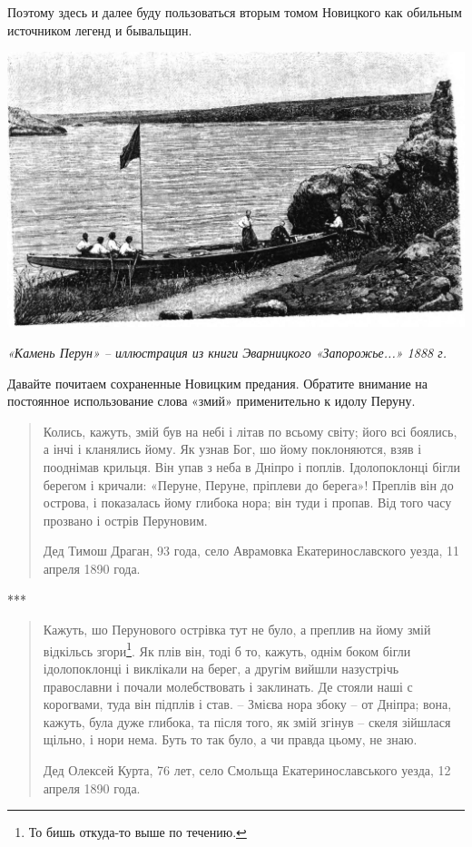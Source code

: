 Поэтому здесь и далее буду пользоваться вторым томом Новицкого как обильным источником легенд и бывальщин. 

\begin{center}
\includegraphics[width=\linewidth]{chast-zmiy/ktotakiezmei/Evarnickij_D_I_Zaporozhje.jpg}

\textit{«Камень Перун» – иллюстрация из книги Эварницкого «Запорожье...» 1888 г.}
\end{center}

Давайте почитаем сохраненные Новицким предания. Обратите внимание на постоянное использование слова «змий» применительно к идолу Перуну.

\begin{quotation}
Колись, кажуть, змій був на небі і літав по всьому світу; його всі боялись, а інчі і кланялись йому. Як узнав Бог, шо йому поклоняются, взяв і пооднімав крильця. Він упав з неба в Дніпро і поплів. Ідолопоклонці бігли берегом і кричали: «Перуне, Перуне, пріплеви до берега»! Преплів він до острова, і показалась йому глибока нора; він туди і пропав. Від того часу прозвано і острів Перуновим.

Дед Тимош Драган, 93 года, село Аврамовка Екатеринославского уезда, 11 апреля 1890 года.
\end{quotation}

\begin{center}
***\end{center}

\begin{quotation}
Кажуть, шо Перунового острівка тут не було, а преплив на йому змій відкільсь згори\footnote{То бишь откуда-то выше по течению.}. Як плів він, тоді б то, кажуть, однім боком бігли ідолопоклонці і виклікали на берег, а другім вийшли назустрічь православни і почали молебствовать і заклинать. Де стояли наші с корогвами, туда він підплів і став. – Змієва нора збоку – от Дніпра; вона, кажуть, була дуже глибока, та після того, як змій згінув – скеля зійшлася щільно, і нори нема. Буть то так було, а чи правда цьому, не знаю.

Дед Олексей Курта, 76 лет, село Смольща
Екатеринославського уезда, 12 апреля 1890 года.
\end{quotation}

